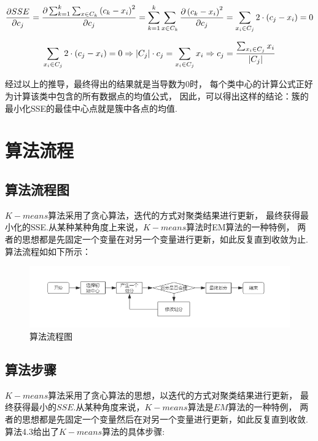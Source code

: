 \documentclass[bachelor,adobefonts]{jnuthesis}
\begin{document}
\begin{equation}
  \centering
  \frac{\partial SSE}{\partial c_j} = 
  \frac{\partial \sum_{k=1}^{k}\sum_{x \in C_k}\left(c_k-x_i\right)^2}
  {\partial c_j} = \sum_{k=1}^{k}\sum_{x \in C_k} 
  \frac{\partial \left(c_k-x_i\right)^2}{\partial c_j} = 
  \sum_{x_i \in C_j} 2 \cdot \left(c_j - x_i\right) = 0
\end{equation}

\begin{equation}
  \centering
  \sum_{x_i \in C_j} 2 \cdot  \left( c_j - x_i \right) = 0 
  \Rightarrow 
  \vert C_j \vert \cdot c_j = \sum_{x_i \in C_j} x_i 
  \Rightarrow 
  c_j = \frac {\sum_{x_i \in C_j} x_i }{\vert C_j \vert}
\end{equation}

经过以上的推导，最终得出的结果就是当导数为0时，
每个类中心的计算公式正好为计算该类中包含的所有数据点的均值公式，
因此，可以得出这样的结论：簇的最小化SSE的最佳中心点就是簇中各点的均值.


\section{算法流程}
\subsection{算法流程图}
$K-means$算法采用了贪心算法，迭代的方式对聚类结果进行更新，
最终获得最小化的SSE.从某种某种角度上来说，$K-means$算法时EM算法的一种特例，
两者的思想都是先固定一个变量在对另一个变量进行更新，如此反复直到收敛为止.
算法流程如如下所示：

\begin{figure}[h!]
  \centering
    \includegraphics[width=1.0\linewidth]{Wsuanfaliuchengtu.png}
  \caption{算法流程图}
\end{figure}





\subsection{算法步骤}

$K-means$算法采用了贪心算法的思想，以迭代的方式对聚类结果进行更新，
最终获得最小的$SSE$.从某种角度来说，$K-means$算法是$EM$算法的一种特例，
两者的思想都是先固定一个变量然后在对另一个变量进行更新，如此反复直到收敛.
算法4.3给出了$K-means$算法的具体步骤: 
\end{document}

